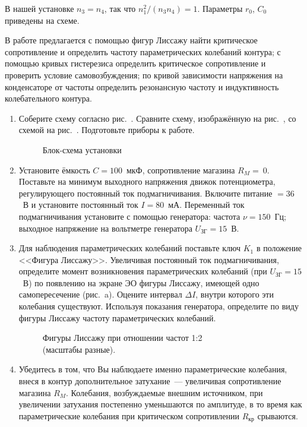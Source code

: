 В нашей установке $n_3 = n_4$, так что $n_1^2/ (n_3n_4) = 1$. Параметры $r_0$, $C_0$ приведены на схеме.
 
\begin{lab:task}
В работе предлагается с помощью фигур Лиссажу найти критическое сопротивление и определить частоту параметрических колебаний контура; с помощью кривых гистерезиса определить критическое сопротивление и проверить условие самовозбуждения; по кривой зависимости напряжения на конденсаторе от частоты определить резонансную частоту и индуктивность колебательного контура. 
\begin{enumerate}
\item 
Соберите схему согласно рис.~. Сравните схему, изображённую на рис.~, со схемой на рис.~. Подготовьте приборы к работе.
\begin{figure}[h!]
	\caption{Блок-схема установки}
\end{figure}	

\item 
Установите ёмкость $C = 100$~мкФ, сопротивление магазина $R_M =~0.$ Поставьте на минимум выходного напряжения движок потенциометра, регулирующего постоянный ток подмагничивания. Включите питание $= 36$~В и установите постоянный ток $I =80$~мА. Переменный ток подмагничивания установите с помощью генератора: частота $\nu = 150$~Гц; выходное напряжение на вольтметре генератора $U_\text{ЗГ} = 15$~В. 

\item 
Для наблюдения параметрических колебаний поставьте ключ $K_1$ в положение <<Фигура Лиссажу>>. Увеличивая постоянный ток подмагничивания, определите момент возникновения параметрических колебаний (при $U_\text{ЗГ} = 15$~В) по появлению на экране ЭО фигуры Лиссажу, имеющей одно самопересечение (рис.~a). Оцените интервал $\Delta I$, внутри которого эти колебания существуют. Используя показания генератора, определите по виду фигуры Лиссажу частоту параметрических колебаний.
\begin{figure}[h!]
	\caption{Фигуры Лиссажу при отношении частот 1:2 \\(масштабы разные).}
\end{figure}	

\item 
Убедитесь в том, что Вы наблюдаете именно параметрические колебания, внеся в контур дополнительное затухание~--- увеличивая сопротивление магазина $R_M$. Колебания, возбуждаемые внешним источником, при увеличении затухания постепенно уменьшаются по амплитуде, в то время как параметрические колебания при критическом сопротивлении $R_\text{кр}$ срываются. 


\end{enumerate}
\end{lab:task}
